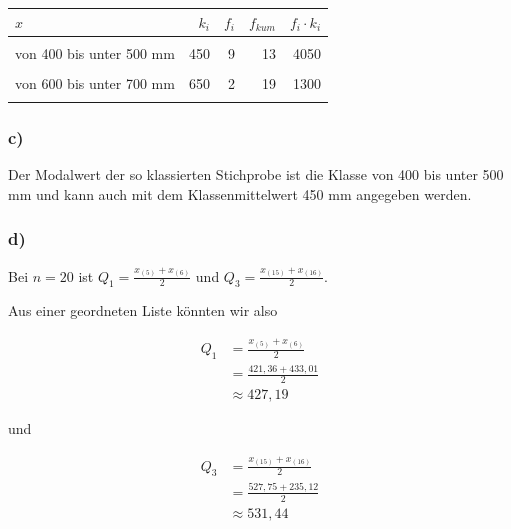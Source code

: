 \documentclass[
  11pt,
  ngerman,
  a4paper,
]{report}
\begin{document}
\begin{table}[H]
\centering
\begin{tabular}{>{\raggedright\arraybackslash}p{8cm}rrrr}
\toprule
\textbf{$x$} & \textbf{$k_i$} & \textbf{$f_i$} & \textbf{$f_{kum}$} & \textbf{$f_i \cdot k_i$}\\
\midrule
\cellcolor{gray!6}{von 300 bis unter 400 mm} & \cellcolor{gray!6}{350} & \cellcolor{gray!6}{4} & \cellcolor{gray!6}{4} & \cellcolor{gray!6}{1400}\\
von 400 bis unter 500 mm & 450 & 9 & 13 & 4050\\
\cellcolor{gray!6}{von 500 bis unter 600 mm} & \cellcolor{gray!6}{550} & \cellcolor{gray!6}{4} & \cellcolor{gray!6}{17} & \cellcolor{gray!6}{2200}\\
von 600 bis unter 700 mm & 650 & 2 & 19 & 1300\\
\cellcolor{gray!6}{von 700 bis unter 800 mm} & \cellcolor{gray!6}{750} & \cellcolor{gray!6}{1} & \cellcolor{gray!6}{20} & \cellcolor{gray!6}{750}\\
\bottomrule
\end{tabular}
\end{table}

\hypertarget{c-6}{%
\subsubsection{c)}\label{c-6}}

Der Modalwert der so klassierten Stichprobe ist die Klasse von 400 bis unter 500 mm und kann auch mit dem Klassenmittelwert 450 mm angegeben werden.

\hypertarget{d-1}{%
\subsubsection{d)}\label{d-1}}

Bei \(n=20\) ist \(Q_1=\frac{x_{(5)}+x_{(6)}}{2}\) und \(Q_3=\frac{x_{(15)}+x_{(16)}}{2}\).

Aus einer geordneten Liste könnten wir also

\[\begin{aligned}
Q_1&=\frac{x_{(5)}+x_{(6)}}{2}\\
   &=\frac{421{,}36+433{,}01}{2}\\
   &\approx427{,}19
\end{aligned}\]

und

\[\begin{aligned}
Q_3&=\frac{x_{(15)}+x_{(16)}}{2}\\
   &=\frac{527{,}75+235{,}12}{2}\\
   &\approx531{,}44
\end{aligned}\]
\end{document}
